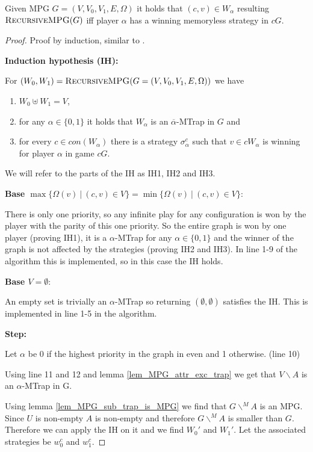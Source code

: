 \begin{theorem}
	Given MPG $G = (V,V_0,V_1,E,\Omega)$ it holds that $(c,v) \in W_\alpha$ resulting $\textsc{RecursiveMPG}(G)$ iff player $\alpha$ has a winning memoryless strategy in $cG$.
	\begin{proof}
		Proof by induction, similar to \cite{ZIELONKA1998135}.
		
		\textbf{Induction hypothesis (IH):}
		
		For $(W_0,W_1) = \textsc{RecursiveMPG}(G = (V,V_0,V_1,E,\Omega))$ we have 
		\begin{enumerate}
			\item $W_0 \uplus W_1 = V$,
			\item for any $\alpha \in \{0,1\}$ it holds that $W_\alpha$ is an $\overline{\alpha}$-MTrap in $G$ and
			\item for every $c\in con(W_\alpha)$ there is a strategy $\sigma_\alpha^c$ such that $v \in cW_\alpha$ is winning for player $\alpha$ in game $cG$.
		\end{enumerate}
	We will refer to the parts of the IH as IH1, IH2 and IH3.
		
		\textbf{Base $\max\{ \Omega(v)\ |\ (c,v) \in V\} = \min\{ \Omega(v)\ |\ (c,v) \in V\}$}:
		
		There is only one priority, so any infinite play for any configuration is won by the player with the parity of this one priority. So the entire graph is won by one player (proving IH1), it is a $\alpha$-MTrap for any $\alpha \in \{0,1\}$ and the winner of the graph is not affected by the strategies (proving IH2 and IH3). In line 1-9 of the algorithm this is implemented, so in this case the IH holds.
		
		\textbf{Base $V = \emptyset$}:
		
		An empty set is trivially an $\alpha$-MTrap so returning $(\emptyset,\emptyset)$ satisfies the IH. This is implemented in line 1-5 in the algorithm.
		
		\textbf{Step:}
		
		Let $\alpha$ be 0 if the highest priority in the graph in even and 1 otherwise. (line 10)
		
		Using line 11 and 12 and lemma \ref{lem_MPG_attr_exc_trap} we get that $V\backslash A$ is an $\alpha$-MTrap in G.
		
		Using lemma \ref{lem_MPG_sub_trap_is_MPG} we find that $G \backslash^{\!\!M}A$ is an MPG. Since $U$ is non-empty $A$ is non-empty and therefore $G \backslash^{\!\!M}A$ is smaller than $G$. Therefore we can apply the IH on it and we find $W_0'$ and $W_1'$. Let the associated strategies be $w_0^c$ and $w_1^c$.
		

\end{proof}
\end{theorem}
